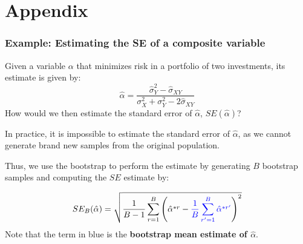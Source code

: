 \documentclass[smaller]{beamer}
\newcommand{\lt}{\left}
\newcommand{\rt}{\right}
\newcommand{\?}{\stackrel{?}{=}}
\newcommand{\fr}{\frac}
\newcommand{\bl}{\color{blue}}
\newcommand{\al}{\alpha}
\newcommand{\si}{\sigma}
\begin{document}


  



\section{Appendix}
\begin{frame}
  \frametitle{Example: Estimating the SE of a composite variable}
  Given a variable $\al$ that minimizes risk in a portfolio of two investments, its estimate is given by:\pause
  \begin{equation}
    \label{eq:18}
    \hat\al = \fr{\hat\si_Y^2 - \hat\si_{XY}}{\si_{X}^2 + \si_Y^2 - 2\hat\si_{XY}}
  \end{equation}
  \pause
  How would we then estimate the standard error of $\hat\al$, $SE(\hat\al)$? \pause
  
  \begin{exampleblock}{}
  In practice, it is impossible to estimate the standard error of $\hat\alpha$, as we cannot generate brand new samples from the original population.\\ \pause

  Thus, we use the bootstrap to perform the estimate by generating $B$ bootstrap samples and computing the $SE$ estimate
  by:\pause
  
  \begin{equation}
    \label{eq:10}
    SE_{B}(\hat\al) = \sqrt{\fr{1}{B-1}\sum_{r=1}^B\lt( \hat\alpha^{*r} - {\bl \fr1B\sum_{r'=1}^B\hat\al^{*r'}} \rt)^2 }
  \end{equation}
  \pause
  Note that the term in blue is the \textbf{\bl bootstrap mean estimate of $\hat\al$}.
\end{exampleblock}

\end{frame}
\end{document}
